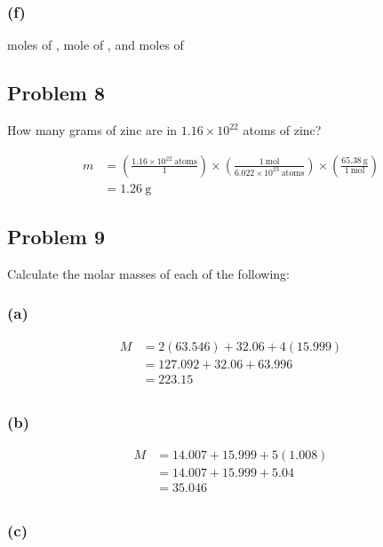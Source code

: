 \documentclass[11pt]{scrartcl}
\begin{document}
\subsubsection{(f)}
 moles of ,  mole of , and  moles of 

\newpage
\subsection{Problem 8}
How many grams of zinc are in $1.16 \times 10^{22}$ atoms of zinc?

\begin{align*}
    m &= \left ( \frac{1.16\times 10^{22}\ \text{atoms}}{1} \right) \times \left ( \frac{1\ \text{mol}}{6.022 \times 10^{23}\  \text{atoms}} \right) \times \left ( \frac{65.38\ \text{g}}{1\ \text{mol}} \right) \\
    &= \boxed{1.26\ \text{g}}
\end{align*}

\newpage
\subsection{Problem 9}
Calculate the molar masses of each of the following:
\subsubsection{(a)}

\begin{align*}
    M &= 2 \left (63.546 \right) + 32.06 + 4 \left (15.999 \right) \\
    &= 127.092 + 32.06 + 63.996 \\
    &= \boxed{223.15} \\
\end{align*}

\subsubsection{(b)}

\begin{align*}
    M &= 14.007 + 15.999 + 5 \left (1.008 \right) \\
    &= 14.007 + 15.999 + 5.04 \\
    &= \boxed{35.046} \\
\end{align*}

\subsubsection{(c)}
\end{document}
